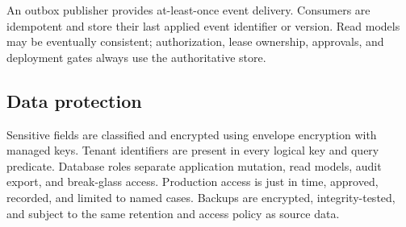An outbox publisher provides at-least-once event delivery. Consumers are idempotent and
store their last applied event identifier or version. Read models may be eventually
consistent; authorization, lease ownership, approvals, and deployment gates always use
the authoritative store.

\subsection{Data protection}

Sensitive fields are classified and encrypted using envelope encryption with managed
keys. Tenant identifiers are present in every logical key and query predicate. Database
roles separate application mutation, read models, audit export, and break-glass access.
Production access is just in time, approved, recorded, and limited to named cases.
Backups are encrypted, integrity-tested, and subject to the same retention and access
policy as source data.

